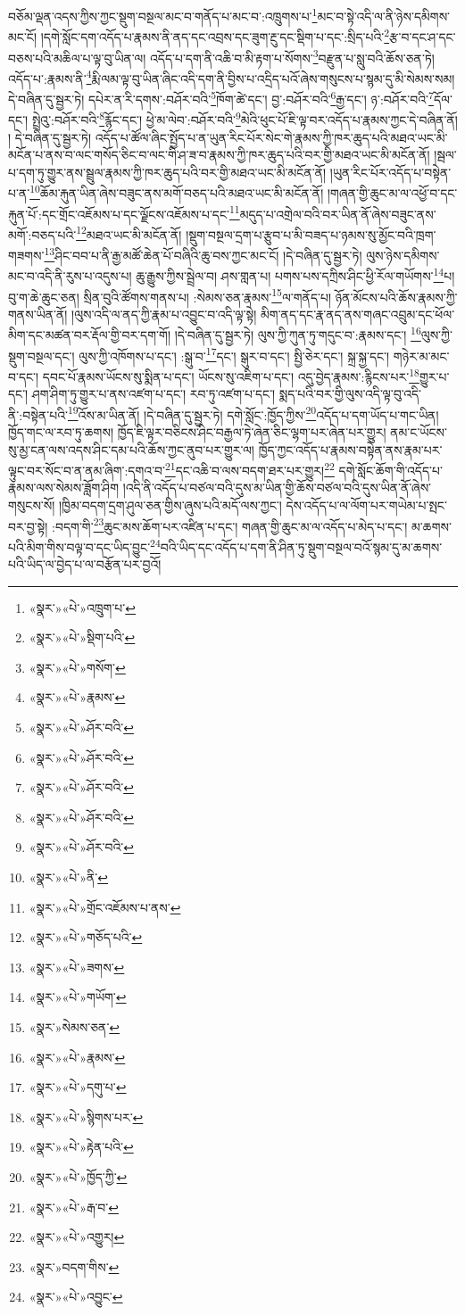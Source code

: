 བཅོམ་ལྡན་འདས་ཀྱིས་ཀྱང་སྡུག་བསྔལ་མང་བ་གནོད་པ་མང་བ་:འཁྲུགས་པ་\footnote{«སྣར་»«པེ་»འཁྲུག་པ་}མང་བ་སྟེ་འདི་ལ་ནི་ཉེས་དམིགས་མང་ངོ། །དགེ་སློང་དག་འདོད་པ་རྣམས་ནི་ནད་དང་འབྲས་དང་ཟུག་རྔུ་དང་སྡིག་པ་དང་:སྲིད་པའི་\footnote{«སྣར་»«པེ་»སྡིག་པའི་}རྩ་བ་དང་ཤ་དང་བཅས་པའི་མཆིལ་པ་ལྟ་བུ་ཡིན་ལ། འདོད་པ་དག་ནི་འཆི་བ་མི་རྟག་པ་སོགས་\footnote{«སྣར་»«པེ་»གསོག་}བརྫུན་པ་སླུ་བའི་ཆོས་ཅན་ཏེ། འདོད་པ་:རྣམས་ནི་\footnote{«སྣར་»«པེ་»རྣམས་}རྨི་ལམ་ལྟ་བུ་ཡིན་ཞིང་འདི་དག་ནི་བྱིས་པ་འདྲིད་པའོ་ཞེས་གསུངས་པ་སྙམ་དུ་མི་སེམས་སམ། དེ་བཞིན་དུ་སྦྱར་ཏེ། དཔེར་ན་རི་དགས་:བཤོར་བའི་\footnote{«སྣར་»«པེ་»ཤོར་བའི་}ཁོག་ཚེ་དང་། བྱ་:བཤོར་བའི་\footnote{«སྣར་»«པེ་»ཤོར་བའི་}རྒྱ་དང་། ཉ་:བཤོར་བའི་\footnote{«སྣར་»«པེ་»ཤོར་བའི་}དོལ་དང་། སྤྲེའུ་:བཤོར་བའི་\footnote{«སྣར་»«པེ་»ཤོར་བའི་}རྙོང་དང་། ཕྱེ་མ་ལེབ་:བཤོར་བའི་\footnote{«སྣར་»«པེ་»ཤོར་བའི་}མེའི་ཕུང་པོ་ཇི་ལྟ་བར་འདོད་པ་རྣམས་ཀྱང་དེ་བཞིན་ནོ། །
དེ་བཞིན་དུ་སྦྱར་ཏེ། འདོད་པ་ཚོལ་ཞིང་སྤྱོད་པ་ན་ཡུན་རིང་པོར་སེང་གེ་རྣམས་ཀྱི་ཁར་ཆུད་པའི་མཐའ་ཡང་མི་མངོན་པ་ནས་བ་ལང་གསོད་ཅིང་བ་ལང་གི་ཤ་ཟ་བ་རྣམས་ཀྱི་ཁར་ཆུད་པའི་བར་གྱི་མཐའ་ཡང་མི་མངོན་ནོ། །སྦལ་པ་དག་ཏུ་གྱུར་ནས་སྦྲུལ་རྣམས་ཀྱི་ཁར་ཆུད་པའི་བར་གྱི་མཐའ་ཡང་མི་མངོན་ནོ། །ཡུན་རིང་པོར་འདོད་པ་བསྟེན་པ་ན་\footnote{«སྣར་»«པེ་»ནི་}ཆོམ་རྐུན་ཡིན་ཞེས་བཟུང་ནས་མགོ་བཅད་པའི་མཐའ་ཡང་མི་མངོན་ནོ། །གཞན་གྱི་ཆུང་མ་ལ་འཕྱོ་བ་དང་རྐུན་པོ་:དང་གྲོང་འཇོམས་པ་དང་ལྗོངས་འཇོམས་པ་དང་\footnote{«སྣར་»«པེ་»གྲོང་འཇོམས་པ་ནས་}མདུད་པ་འགྲེལ་བའི་བར་ཡིན་ནོ་ཞེས་བཟུང་ནས་མགོ་:བཅད་པའི་\footnote{«སྣར་»«པེ་»གཅོད་པའི་}མཐའ་ཡང་མི་མངོན་ནོ། །སྡུག་བསྔལ་དྲག་པ་རྩུབ་པ་མི་བཟད་པ་ཉམས་སུ་མྱོང་བའི་ཁྲག་གཟགས་\footnote{«སྣར་»«པེ་»ཟགས་}ཤིང་བབ་པ་ནི་རྒྱ་མཚོ་ཆེན་པོ་བཞིའི་ཆུ་བས་ཀྱང་མང་ངོ། །དེ་བཞིན་དུ་སྦྱར་ཏེ། ལུས་ཉེས་དམིགས་མང་བ་འདི་ནི་རུས་པ་འདུས་པ། ཆུ་རྒྱུས་ཀྱིས་སྦྲེལ་བ། ཤས་གླན་པ། པགས་པས་དཀྲིས་ཤིང་ཕྱི་རོལ་གཡོགས་\footnote{«སྣར་»«པེ་»གཡོག་}པ། བུ་ག་ཆེ་ཆུང་ཅན། སྲིན་བུའི་ཚོགས་གནས་པ། :སེམས་ཅན་རྣམས་\footnote{«སྣར་»སེམས་ཅན་}ལ་གནོད་པ། ཉོན་མོངས་པའི་ཆོས་རྣམས་ཀྱི་གནས་ཡིན་ནོ། །ལུས་འདི་ལ་ནད་ཀྱི་རྣམ་པ་འབྱུང་བ་འདི་ལྟ་སྟེ། མིག་ནད་དང་རྣ་ནད་ནས་གཞང་འབྲུམ་དང་ཕོལ་མིག་དང་མཚན་བར་རྡོལ་གྱི་བར་དག་གོ། །དེ་བཞིན་དུ་སྦྱར་ཏེ། ལུས་ཀྱི་ཀུན་ཏུ་གདུང་བ་:རྣམས་དང་། \footnote{«སྣར་»«པེ་»རྣམས་}ལུས་ཀྱི་སྡུག་བསྔལ་དང་། ལུས་ཀྱི་འཁོགས་པ་དང་། :སྒུ་བ་\footnote{«སྣར་»«པེ་»དགུ་པ་}དང་། སྒུར་བ་དང་། སྤྱི་ཅེར་དང་། སྐྲ་སྐྱ་དང་། གཉེར་མ་མང་བ་དང་། དབང་པོ་རྣམས་ཡོངས་སུ་སྨིན་པ་དང་། ཡོངས་སུ་འཇིག་པ་དང་། འདུ་བྱེད་རྣམས་:རྙིངས་པར་\footnote{«སྣར་»«པེ་»སྙིགས་པར་}གྱུར་པ་དང་། ཤག་ཤིག་ཏུ་གྱུར་པ་ནས་འཛག་པ་དང་། རབ་ཏུ་འཛག་པ་དང་། སྨད་པའི་བར་གྱི་ལུས་འདི་ལྟ་བུ་འདི་ནི་:བསྟེན་པའི་\footnote{«སྣར་»«པེ་»རྟེན་པའི་}འོས་མ་ཡིན་ནོ། །དེ་བཞིན་དུ་སྦྱར་ཏེ། དགེ་སློང་:ཁྱོད་ཀྱིས་\footnote{«སྣར་»«པེ་»ཁྱོད་ཀྱི་}འདོད་པ་དག་ཡོད་པ་གང་ཡིན། ཁྱོད་གང་ལ་རབ་ཏུ་ཆགས། ཁྱོད་ཇི་ལྟར་བཅིངས་ཤིང་བརྒྱལ་ཏེ་ཞེན་ཅིང་ལྷག་པར་ཞེན་པར་གྱུར། ནམ་ང་ཡོངས་སུ་མྱ་ངན་ལས་འདས་ཤིང་དམ་པའི་ཆོས་ཀྱང་ནུབ་པར་གྱུར་ལ། ཁྱོད་ཀྱང་འདོད་པ་རྣམས་བསྟེན་ནས་རྣམ་པར་ལྟུང་བར་སོང་བ་ན་ནམ་ཞིག་:དགའ་བ་\footnote{«སྣར་»«པེ་»རྒ་བ་}དང་འཆི་བ་ལས་བདག་ཐར་པར་གྱུར།\footnote{«སྣར་»«པེ་»འགྱུར།} དགེ་སློང་ཆོག་གི་འདོད་པ་རྣམས་ལས་སེམས་ཟློག་ཤིག །འདི་ནི་འདོད་པ་བཙལ་བའི་དུས་མ་ཡིན་གྱི་ཆོས་བཙལ་བའི་དུས་ཡིན་ནོ་ཞེས་གསུངས་སོ། །ཁྱིམ་བདག་དྲག་ཤུལ་ཅན་གྱིས་ཞུས་པའི་མདོ་ལས་ཀྱང་། དེས་འདོད་པ་ལ་ལོག་པར་གཡེམ་པ་སྤང་བར་བྱ་སྟེ། :བདག་གི་\footnote{«སྣར་»བདག་གིས་}ཆུང་མས་ཆོག་པར་འཛིན་པ་དང་། གཞན་གྱི་ཆུང་མ་ལ་འདོད་པ་མེད་པ་དང་། མ་ཆགས་པའི་མིག་གིས་བལྟ་བ་དང་ཡིད་བྱུང་\footnote{«སྣར་»«པེ་»འབྱུང་}བའི་ཡིད་དང་འདོད་པ་དག་ནི་ཤིན་ཏུ་སྡུག་བསྔལ་བའོ་སྙམ་དུ་མ་ཆགས་པའི་ཡིད་ལ་བྱེད་པ་ལ་བརྩོན་པར་བྱའོ། 